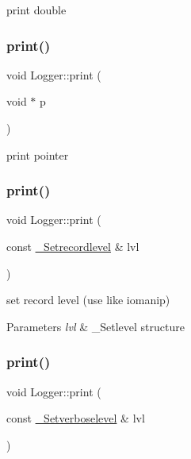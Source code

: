 print double \mbox{\label{classez_1_1logging_1_1Logger_a5c8c3349b7d4aa76dfe90b1e3dc0ce00}} 
\subsubsection{\texorpdfstring{print()}{print()}\hspace{0.1cm}{\footnotesize\ttfamily [10/14]}}
{\footnotesize\ttfamily void Logger\+::print (\begin{DoxyParamCaption}\item[{void $\ast$}]{p }\end{DoxyParamCaption})}

print pointer \mbox{\label{classez_1_1logging_1_1Logger_a3fcf2f4da96bd7a0fd33b055a23fdef3}} 
\subsubsection{\texorpdfstring{print()}{print()}\hspace{0.1cm}{\footnotesize\ttfamily [11/14]}}
{\footnotesize\ttfamily void Logger\+::print (\begin{DoxyParamCaption}\item[{const \hyperlink{structez_1_1logging_1_1__Setrecordlevel}{\+\_\+\+Setrecordlevel} \&}]{lvl }\end{DoxyParamCaption})}

set record level (use like iomanip) 
\begin{DoxyParams}{Parameters}
{\em lvl} & \+\_\+\+Setlevel structure \\
\hline
\end{DoxyParams}
\mbox{\label{classez_1_1logging_1_1Logger_a20117d944ec1fa0aa3302981c620d8b6}} 
\subsubsection{\texorpdfstring{print()}{print()}\hspace{0.1cm}{\footnotesize\ttfamily [12/14]}}
{\footnotesize\ttfamily void Logger\+::print (\begin{DoxyParamCaption}\item[{const \hyperlink{structez_1_1logging_1_1__Setverboselevel}{\+\_\+\+Setverboselevel} \&}]{lvl }\end{DoxyParamCaption})}


